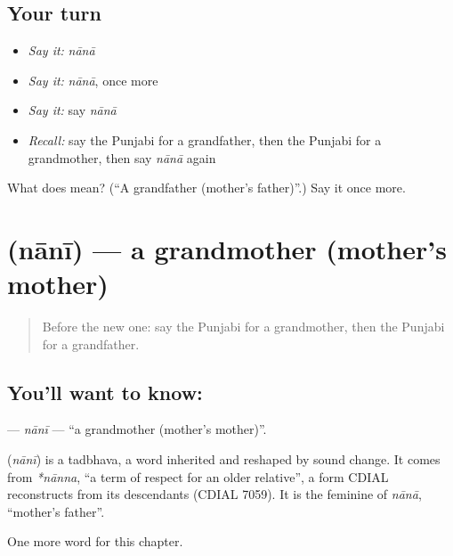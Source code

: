 \subsection*{Your turn}
\begin{itemize}
\raggedright
  \item \emph{Say it:} \emph{nānā}
  \item \emph{Say it:} \emph{nānā}, once more
  \item \emph{Say it:} say \emph{nānā}
  \item \emph{Recall:} say the Punjabi for a grandfather, then the Punjabi for a grandmother, then say \emph{nānā} again
\end{itemize}

\begin{tcolorbox}[breakable,colback=teal!4,colframe=teal!35!black,title={Before you move on}]
What does  mean? (\textquotedblleft{}A grandfather (mother's father)\textquotedblright{}.) Say it once more.
\end{tcolorbox}
\section[\texorpdfstring{\pa{ਨਾਨੀ} (nānī)}{ਨਾਨੀ (nānī)}]{ (nānī) — a grandmother (mother's mother)}

\label{lesson:PA-C54-nani}



\begin{quote}
Before the new one: say the Punjabi for a grandmother, then the Punjabi for a grandfather.
\end{quote}

\subsection*{You'll want to know: }
\textbf{} — \emph{nānī} — \textquotedblleft{}a grandmother (mother's mother)\textquotedblright{}.

\begin{cousinweb}
\textbf{} (\emph{nānī}) is a tadbhava, a word inherited and reshaped by sound change. It comes from \emph{*nānna}, \textquotedblleft{}a term of respect for an older relative\textquotedblright{}, a form CDIAL reconstructs from its descendants (CDIAL 7059). It is the feminine of \emph{nānā}, \textquotedblleft{}mother's father\textquotedblright{}.
\end{cousinweb}

\begin{grammarlens}[title={What you've built}]
One more word for this chapter.
\end{grammarlens}

